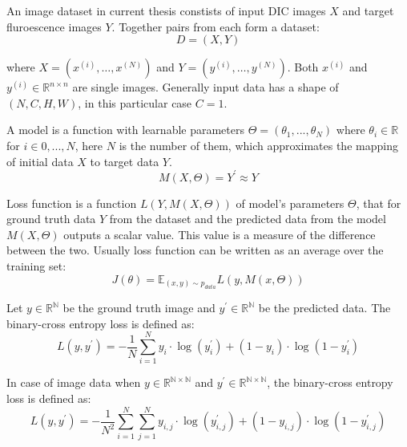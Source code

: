\begin{definition}
	An image dataset in current thesis constists of input DIC images $X$ and target fluroescence images $Y$. Together pairs from each form a dataset:
	\begin{equation}
		D = (X, Y)
	\end{equation}

	where $X = (x^{(i)}, \dots, x^{(N)})$ and $Y = (y^{(i)}, \dots, y^{(N)})$. Both $x^{(i)}$ and $y^{(i)} \in \mathbb{R}^{n \times n}$ are single images. Generally input data has a shape of $(N, C, H, W)$, in this particular case $C = 1$.
\end{definition}


\begin{definition}[Model]
	A model is a function with learnable parameters $\Theta = (\theta_1, ..., \theta_N)$ where $\theta_i \in \mathbb{R}$ for $i \in {0, ..., N}$, here $N$ is the number of them, which approximates the mapping of initial data $X$ to target data $Y$.
	\begin{equation}
		M(X,\Theta) = Y^\prime \approx Y 
	\end{equation}
\end{definition}

\begin{definition}
	Loss function is a function $L(Y, M(X, \Theta))$ of model's parameters $\Theta$, that for ground truth data $Y$ from the dataset and the predicted data from the model $M(X, \Theta)$ outputs a scalar value. This value is a measure of the difference between the two. Usually loss function can be written as an average over the training set:
	\begin{equation}
		J(\theta) = \mathbb{E}_{(x, y)\sim p_{data}} L(y, M(x, \Theta))
	\end{equation}
\end{definition}

\begin{definition}
	Let $y \in \mathbb{R^N}$ be the ground truth image and $y^\prime \in \mathbb{R^N}$ be the predicted data. The binary-cross entropy loss is defined as:
	\begin{equation}
		L(y, y^\prime) = - \frac{1}{N}\sum_{i=1}^{N} y_i \cdot \log(y_i^\prime) +  (1 - y_i) \cdot \log(1 - y_i^\prime) 
	\end{equation}

	In case of image data when $y \in \mathbb{R^{N \times N}}$ and $y^\prime \in \mathbb{R^{N \times N}}$, the binary-cross entropy loss is defined as:
	\begin{equation}
		L(y, y^\prime) = - \frac{1}{N^2}\sum_{i=1}^{N} \sum_{j=1}^{N} y_{i,j} \cdot \log(y_{i, j}^\prime) +  (1 - y_{i, j}) \cdot \log(1 - y_{i, j}^\prime) 
	\end{equation}
\end{definition}

